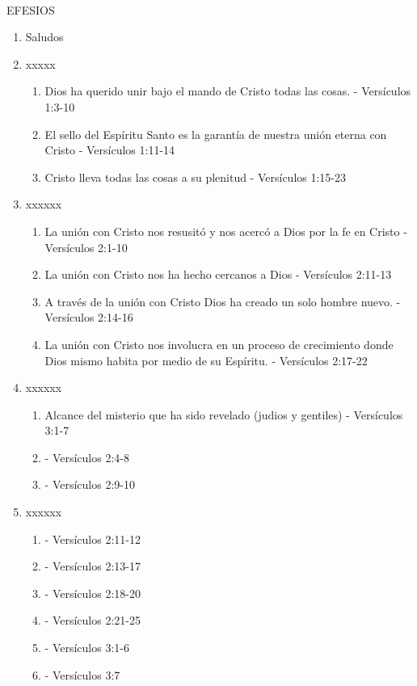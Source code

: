 \documentclass[9pt,letterpaper]{article}
\author{Ciencias}
\begin{document}
	\\
	{\large EFESIOS}\\
	
	\begin{enumerate}
		\item Saludos
		\item  xxxxx
		\begin{enumerate}
			\item Dios ha querido unir bajo el mando de Cristo todas las cosas. - Versículos 1:3-10
			\item El sello del Espíritu Santo es la garantía de nuestra unión eterna con Cristo - Versículos 1:11-14
			\item Cristo lleva todas las cosas a su plenitud - Versículos 1:15-23
		\end{enumerate}
		\item xxxxxx
		\begin{enumerate}
			\item La unión con Cristo nos resusitó y nos acercó a Dios por la fe en Cristo - Versículos 2:1-10
			\item La unión con Cristo nos ha hecho cercanos a Dios - Versículos 2:11-13
			\item A través de la unión con Cristo Dios ha creado un solo hombre nuevo. - Versículos 2:14-16
			\item La unión con Cristo nos involucra en un proceso de crecimiento donde Dios mismo habita por medio de su Espíritu. - Versículos 2:17-22
		\end{enumerate}
		\item xxxxxx
		\begin{enumerate}
			\item Alcance del misterio que ha sido revelado (judios y gentiles) - Versículos 3:1-7
			\item  - Versículos 2:4-8
			\item  - Versículos 2:9-10
		\end{enumerate}
		\item xxxxxx
		\begin{enumerate}
			\item  - Versículos 2:11-12
			\item  - Versículos 2:13-17
			\item  - Versículos 2:18-20
			\item  - Versículos 2:21-25
			\item  - Versículos 3:1-6
			\item  - Versículos 3:7

\end{enumerate}
\end{enumerate}
\end{document}

